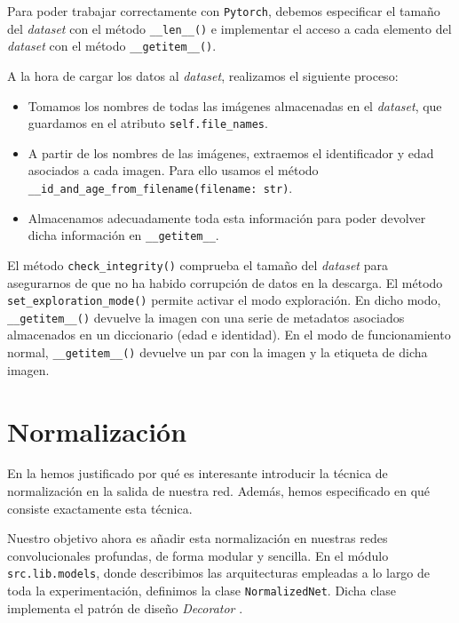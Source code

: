 Para poder trabajar correctamente con \lstinline{Pytorch}, debemos especificar el tamaño del \textit{dataset} con el método \lstinline{__len__()} e implementar el acceso a cada elemento del \textit{dataset} con el método \lstinline{__getitem__()}.

A la hora de cargar los datos al \textit{dataset}, realizamos el siguiente proceso:

\begin{itemize}
	\item Tomamos los nombres de todas las imágenes almacenadas en el \textit{dataset}, que guardamos en el atributo \lstinline{self.file_names}.
	\item A partir de los nombres de las imágenes, extraemos el identificador y edad asociados a cada imagen. Para ello usamos el método \lstinline{__id_and_age_from_filename(filename: str)}.
	\item Almacenamos adecuadamente toda esta información para poder devolver dicha información en \lstinline{__getitem__}.
\end{itemize}

El método \lstinline{check_integrity()} comprueba el tamaño del \textit{dataset} para asegurarnos de que no ha habido corrupción de datos en la descarga. El método \lstinline{set_exploration_mode()} permite activar el modo exploración. En dicho modo, \lstinline{__getitem__()} devuelve la imagen con una serie de metadatos asociados almacenados en un diccionario (edad e identidad). En el modo de funcionamiento normal, \lstinline{__getitem__()} devuelve un par con la imagen y la etiqueta de dicha imagen.

\section{Normalización} \label{isubs:normalization_impl}

En la  hemos justificado por qué es interesante introducir la técnica de normalización en la salida de nuestra red. Además, hemos especificado en qué consiste exactamente esta técnica.

Nuestro objetivo ahora es añadir esta normalización en nuestras redes convolucionales profundas, de forma modular y sencilla. En el módulo \lstinline{src.lib.models}, donde describimos las arquitecturas empleadas a lo largo de toda la experimentación, definimos la clase \lstinline{NormalizedNet}. Dicha clase implementa el patrón de diseño \textit{Decorator} \cite{informatica:design_patterns} \cite{informatica:decorator_pattern}.

